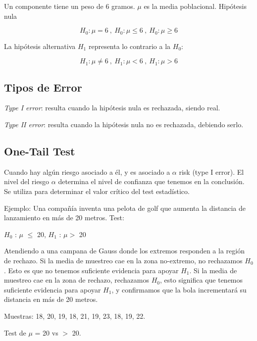 \documentclass[oneside]{book}
\begin{document}
Un componente tiene un peso de 6 gramos. $\mu$ es la media poblacional. Hipótesis nula

\begin{equation}
H_0 : \mu = 6 \ , \ H_0 : \mu \leq 6 \ , \ H_0 : \mu \geq 6
\end{equation}

La hipótesis alternativa $H_1$ representa lo contrario a la $H_0$:

\begin{equation}
H_1 : \mu \neq 6 \ , \ H_1 : \mu < 6 \ , \ H_1 : \mu > 6
\end{equation}

\subsection{Tipos de Error}

\textit{Type I error}: resulta cuando la hipótesis nula es rechazada, siendo real. 

\textit{Type II error}: resulta cuando la hipótesis nula no es rechazada, debiendo serlo.

\subsection{One-Tail Test}

Cuando hay algún riesgo asociado a él, y es asociado a $\alpha$ risk (type I error). El nivel del riesgo $\alpha$ determina el nivel de confianza que tenemos en la conclusión. Se utiliza para determinar el valor crítico del test estadístico.

Ejemplo: Una compañía inventa una pelota de golf que aumenta la distancia de lanzamiento en más de 20 metros. Test:  \newline \begin{center}
	$H_0$ : $\mu$ $\leq$ 20, $H_1$ : $\mu >$ 20
\end{center}

Atendiendo a una campana de Gauss donde los extremos responden a la región de rechazo. Si la media de muestreo cae en la zona no-extremo, no rechazamos $H_0$. Esto es que no tenemos suficiente evidencia para apoyar $H_1$. Si la media de muestreo cae en la zona de rechazo, rechazamos $H_0$, esto significa que tenemos suficiente evidencia para apoyar $H_1$, y confirmamos que la bola incrementará su distancia en más de 20 metros.

Muestras: 18, 20, 19, 18, 21, 19, 23, 18, 19, 22. 
 
Test de $\mu$ = 20 vs $>$ 20. 
\end{document}
